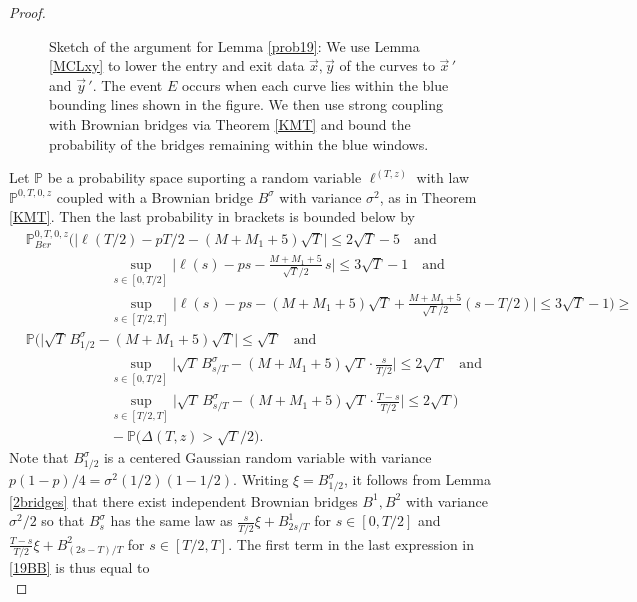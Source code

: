 \begin{proof}
\begin{figure}
	\caption{Sketch of the argument for Lemma \ref{prob19}: We use Lemma \ref{MCLxy} to lower the entry and exit data $\vec{x},\vec{y}$ of the curves to $\vec x\,'$ and $\vec y\,'$. The event $E$ occurs when each curve lies within the blue bounding lines shown in the figure. We then use strong coupling with Brownian bridges via Theorem \ref{KMT} and bound the probability of the bridges remaining within the blue windows.}
\end{figure}
	Let $\mathbb{P}$ be a probability space suporting a random variable $\ell^{(T,z)}$ with law $\mathbb{P}^{0,T,0,z}$ coupled with a Brownian bridge $B^\sigma$ with variance $\sigma^2$, as in Theorem \ref{KMT}. Then the last probability in brackets is bounded below by
	\begin{equation}\label{19BB}
	\begin{split}
	& \mathbb{P}^{0,T,0,z}_{Ber}\Big(\big|\ell(T/2)-pT/2-(M+M_1+5)\sqrt{T}\big|\leq 2\sqrt{T} - 5\quad\mathrm{and}\\
	&\qquad\qquad\qquad \sup_{s\in[0,T/2]}\Big|\ell(s)-ps-\frac{M+M_1+5}{\sqrt{T}/2}\,s\Big| \leq 3\sqrt{T} - 1 \quad\mathrm{and}\\
	&\qquad\qquad\qquad \sup_{s\in[T/2,T]}\Big|\ell(s)-ps-(M+M_1+5)\sqrt{T}+\frac{M+M_1+5}{\sqrt{T}/2}(s-T/2)\Big| \leq 3\sqrt{T} - 1 \Big) \geq\\
	& \mathbb{P}\Big(\big|\sqrt{T}\,B^\sigma_{1/2} - (M+M_1+5)\sqrt{T}\big|\leq \sqrt{T} \quad\mathrm{and}\\
	&\qquad\qquad\qquad\sup_{s\in[0,T/2]}\Big|\sqrt{T}\,B^\sigma_{s/T}-(M+M_1+5)\sqrt{T}\cdot\frac{s}{T/2}\Big| \leq 2\sqrt{T}\quad\mathrm{and}\\
	&\qquad\qquad\qquad \sup_{s\in[T/2,T]}\Big|\sqrt{T}\,B^\sigma_{s/T}-(M+M_1+5)\sqrt{T}\cdot\frac{T-s}{T/2}\Big| \leq 2\sqrt{T} \Big)\\
	&\qquad\qquad\qquad -  \mathbb{P}\Big(\Delta(T,z) > \sqrt{T}/2\Big).
	\end{split}
	\end{equation}
	Note that $B^\sigma_{1/2}$ is a centered Gaussian random variable with variance $p(1-p)/4 = \sigma^2(1/2)(1-1/2)$. Writing $\xi = B^\sigma_{1/2}$, it follows from Lemma \ref{2bridges} that there exist independent Brownian bridges $B^1,B^2$ with variance $\sigma^2/2$ so that $B^\sigma_s$ has the same law as $\frac{s}{T/2}\xi + B^1_{2s/T}$ for $s\in[0,T/2]$ and $\frac{T-s}{T/2}\xi + B^2_{(2s-T)/T}$ for $s\in[T/2,T]$. The first term in the last expression in \eqref{19BB} is thus equal to
	\begin{equation}\label{prob19split}

\end{equation}
\end{proof}
